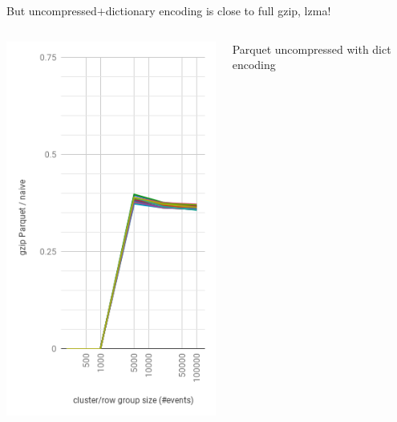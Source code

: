 \documentclass[aspectratio=169]{beamer}
\begin{document}
\begin{frame}{But uncompressed$+$dictionary encoding is close to full gzip, lzma!}
\begin{columns}
\begin{center}
\includegraphics[width=\linewidth]{parquet-gzip-2.png}
\end{center}
\begin{center}
Parquet uncompressed
with dict encoding


\end{center}
\end{columns}
\end{frame}
\end{document}
